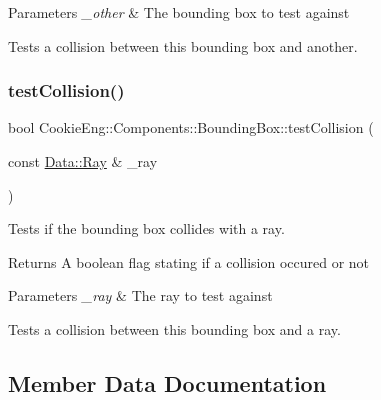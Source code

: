\begin{DoxyParams}{Parameters}
{\em \+\_\+other} & The bounding box to test against\\
\hline
\end{DoxyParams}
Tests a collision between \textquotesingle{}this\textquotesingle{} bounding box and another. \mbox{\label{class_cookie_eng_1_1_components_1_1_bounding_box_aebb0d8b30c7d24d9617b391434205769}} 
\subsubsection{\texorpdfstring{test\+Collision()}{testCollision()}\hspace{0.1cm}{\footnotesize\ttfamily [2/2]}}
{\footnotesize\ttfamily bool Cookie\+Eng\+::\+Components\+::\+Bounding\+Box\+::test\+Collision (\begin{DoxyParamCaption}\item[{const \hyperlink{struct_cookie_eng_1_1_data_1_1_ray}{Data\+::\+Ray} \&}]{\+\_\+ray }\end{DoxyParamCaption})}



Tests if the bounding box collides with a ray. 

\begin{DoxyReturn}{Returns}
A boolean flag stating if a collision occured or not 
\end{DoxyReturn}

\begin{DoxyParams}{Parameters}
{\em \+\_\+ray} & The ray to test against\\
\hline
\end{DoxyParams}
Tests a collision between \textquotesingle{}this\textquotesingle{} bounding box and a ray. 

\subsection{Member Data Documentation}
\mbox{\label{class_cookie_eng_1_1_components_1_1_bounding_box_a2075e00805e700e3b24abe83dd26008c}} 
